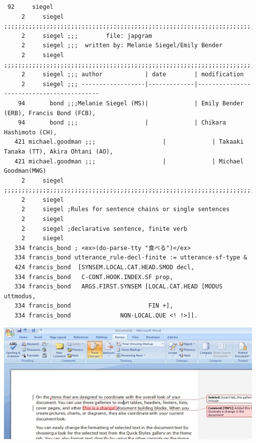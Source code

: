 \documentclass[a4paper,landscape,headrule,footrule,xetex]{foils}
\begin{document}
\begin{tiny}
\begin{verbatim}
 92     siegel 
     2     siegel ;;;;;;;;;;;;;;;;;;;;;;;;;;;;;;;;;;;;;;;;;;;;;;;;;;;;;;;;;;;;;;;;;;;;;;;;;;;;;;;
     2     siegel ;;;        file: japgram
     2     siegel ;;;  written by: Melanie Siegel/Emily Bender
     2     siegel ;;;;;;;;;;;;;;;;;;;;;;;;;;;;;;;;;;;;;;;;;;;;;;;;;;;;;;;;;;;;;;;;;;;;;;;;;;;;;;;
     2     siegel ;;; author            | date        | modification
     2     siegel ;;; ------------------|-------------|------------------------------------------
    94       bond ;;;Melanie Siegel (MS)|             | Emily Bender (ERB), Francis Bond (FCB), 
    94       bond ;;;                   |             | Chikara Hashimoto (CH),  
   421 michael.goodman ;;;                   |             | Takaaki Tanaka (TT), Akira Ohtani (AO),
   421 michael.goodman ;;;                   |             | Michael Goodman(MWG)
     2     siegel ;;;;;;;;;;;;;;;;;;;;;;;;;;;;;;;;;;;;;;;;;;;;;;;;;;;;;;;;;;;;;;;;;;;;;;;;;;;;;;;
     2     siegel 
     2     siegel ;Rules for sentence chains or single sentences
     2     siegel 
     2     siegel ;declarative sentence, finite verb
     2     siegel 
   334 francis_bond ; <ex>(do-parse-tty "食べる")</ex>
   334 francis_bond utterance_rule-decl-finite := utterance-sf-type &
   424 francis_bond  [SYNSEM.LOCAL.CAT.HEAD.SMOD decl, 
   334 francis_bond   C-CONT.HOOK.INDEX.SF prop,
   334 francis_bond   ARGS.FIRST.SYNSEM [LOCAL.CAT.HEAD [MODUS uttmodus, 
   334 francis_bond 				     FIN +],
   334 francis_bond 		     NON-LOCAL.QUE <! !>]]. 

\end{verbatim}
\end{tiny}



\MyLogo{}
\begin{center}
  \includegraphics[width=\textwidth]{../pics/word-track-changes}
\end{center}
\end{document}
